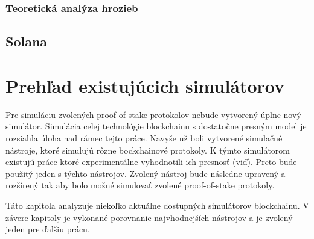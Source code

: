 \subsection{Teoretická analýza hrozieb}

\section{Solana}

\chapter{Prehľad existujúcich simulátorov}

Pre simuláciu zvolených proof-of-stake protokolov nebude vytvorený úplne nový simulátor. Simulácia celej technológie blockchainu s dostatočne presným model je rozsiahla úloha nad rámec tejto práce. Navyše už boli vytvorené simulačné nástroje, ktoré simulujú rôzne bockchainové protokoly. K týmto simulátorom existujú práce ktoré experimentálne vyhodnotili ich presnosť (viď\cite{simulatorCompar, fanPerfEval}). Preto bude použitý jeden s týchto nástrojov. Zvolený nástroj bude následne upravený a rozšírený tak aby bolo možné simulovať zvolené proof-of-stake protokoly. 

Táto kapitola analyzuje niekoľko aktuálne dostupných simulátorov blockchainu. V závere kapitoly je vykonané porovnanie najvhodnejších nástrojov a je zvolený jeden pre ďalšiu prácu.


